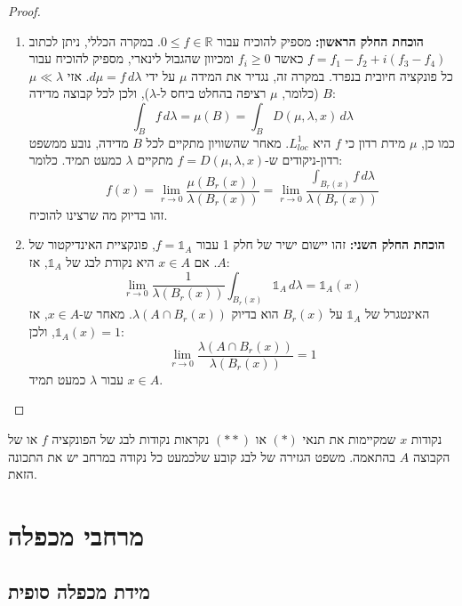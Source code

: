 \documentclass{tstextbook}
\begin{document}
\begin{proof}
  \begin{enumerate}
    \item \textbf{הוכחת החלק הראשון:} 
מספיק להוכיח עבור \(0 \leq f \in \mathbb{R}\). במקרה הכללי, ניתן לכתוב \(f = f_1 - f_2 + i(f_3 - f_4)\) כאשר \(f_i \geq 0\) ומכיוון שהגבול לינארי, מספיק להוכיח עבור כל פונקציה חיובית בנפרד.
במקרה זה, נגדיר את המידה \(\mu\) על ידי \(d\mu = f \, d\lambda\). אזי \(\mu \ll \lambda\) (כלומר, \(\mu\) רציפה בהחלט ביחס ל-\(\lambda\)), ולכן לכל קבוצה מדידה \(B\):
$$ \int_B f \, d\lambda = \mu(B) = \int_B D(\mu, \lambda, x) \, d\lambda $$
כמו כן, \(\mu\) מידת רדון כי \(f\) היא \(L^1_{loc}\).
מאחר שהשוויון מתקיים לכל \(B\) מדידה, נובע ממשפט רדון-ניקודים ש-\(f = D(\mu, \lambda, x)\) מתקיים \(\lambda\) כמעט תמיד. כלומר:
$$ f(x) = \lim_{r \to 0} \frac{\mu(B_r(x))}{\lambda(B_r(x))} = \lim_{r \to 0} \frac{\int_{B_r(x)} f \, d\lambda}{\lambda(B_r(x))} $$
זהו בדיוק מה שרצינו להוכיח.


    \item \textbf{הוכחת החלק השני:} 
זהו יישום ישיר של חלק 1 עבור \(f = \mathbb{1}_A\), פונקציית האינדיקטור של \(A\). אם \(x \in A\) היא נקודת לבג של \(\mathbb{1}_A\), אז:
$$ \lim_{r \to 0} \frac{1}{\lambda(B_r(x))} \int_{B_r(x)} \mathbb{1}_A \, d\lambda = \mathbb{1}_A(x) $$
האינטגרל של \(\mathbb{1}_A\) על \(B_r(x)\) הוא בדיוק \(\lambda(A \cap B_r(x))\). מאחר ש-\(x \in A\), אז \(\mathbb{1}_A(x) = 1\), ולכן:
$$ \lim_{r \to 0} \frac{\lambda(A \cap B_r(x))}{\lambda(B_r(x))} = 1 $$
עבור \(\lambda\) כמעט תמיד \(x \in A\).


  \end{enumerate}
\end{proof}
\begin{remark}
נקודות \(x\) שמקיימות את תנאי \((*)\) או \((**)\) נקראות נקודות לבג של הפונקציה \(f\) או של הקבוצה \(A\) בהתאמה. משפט הגזירה של לבג קובע שלכמעט כל נקודה במרחב יש את התכונה הזאת.

\end{remark}
\section{מרחבי מכפלה}

\subsection{מידת מכפלה סופית}
\end{document}
